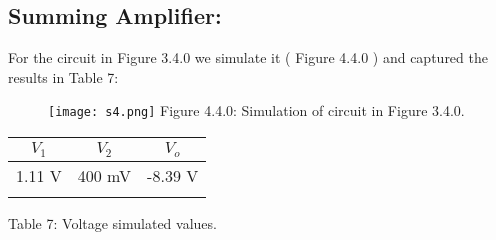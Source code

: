 \subsection{Summing Amplifier:}

For the circuit in Figure 3.4.0 we simulate it ( Figure 4.4.0 ) and captured the results in Table 7:

\begin{figure}[H]
\texttt{[image: s4.png]}
\centering \linebreak \linebreak Figure 4.4.0: Simulation of circuit in Figure 3.4.0.
\end{figure} \hfill

\begin{center}
\begin{tabular}[.5cm]{c c c}
\toprule
\toprule
\hspace{60pt} $V_{1}$ \hspace{60pt} & \hspace{60pt} $V_{2}$ \hspace{60pt} & \hspace{60pt} $V_{o}$ \hspace{60pt}  \\
\midrule
\midrule
1.11 V & 400 mV & -8.39 V \\
\bottomrule
\linebreak
\end{tabular}
\linebreak Table 7: Voltage simulated values.
\end{center} 

\pagebreak
